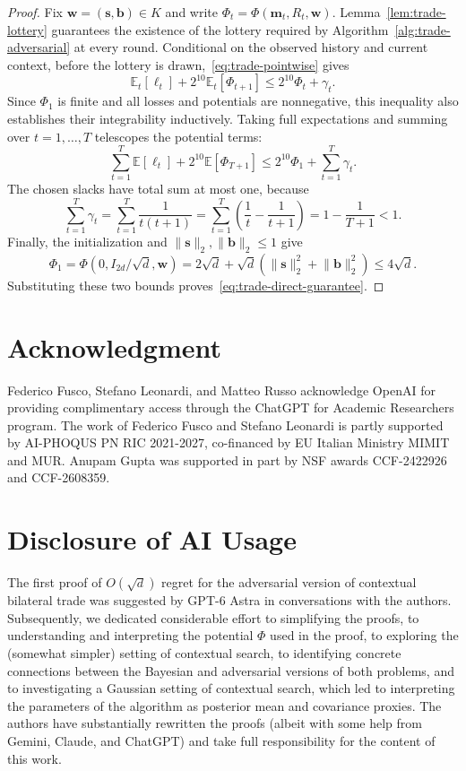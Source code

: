 \documentclass[11pt]{article}
\newcommand{\E}[1]{\mathbb E\left[#1\right]}
\newcommand{\Esub}[2]{\mathbb E_{#1}\left[#2\right]}
\newcommand{\norm}[1]{\lVert #1\rVert_2}
\newcommand{\bm}{\boldsymbol m}
\begin{document}
\begin{proof}

Fix $\boldsymbol w=(\boldsymbol s,\boldsymbol b)\in K$ and write
$\Phi_t=\Phi(\bm_t,R_t,\boldsymbol w)$. Lemma~\ref{lem:trade-lottery}
guarantees the existence of the lottery required by Algorithm~\ref{alg:trade-adversarial}
at every round. Conditional on the observed history and current context, before
the lottery is drawn,~\eqref{eq:trade-pointwise} gives
\[
 \Esub{t}{\ell_t}+2^{10}\Esub{t}{\Phi_{t+1}}
 \le2^{10}\Phi_t+\gamma_t.
\]
Since $\Phi_1$ is finite and all losses and potentials are nonnegative,
this inequality also establishes their integrability inductively. Taking full
expectations and summing over $t=1,\ldots,T$ telescopes the potential terms:
\[
 \sum_{t=1}^T\E{\ell_t}+2^{10}\E{\Phi_{T+1}}
 \le2^{10}\Phi_1+\sum_{t=1}^T\gamma_t.
\]
The chosen slacks have total sum at most one, because
\[
 \sum_{t=1}^T\gamma_t
 =\sum_{t=1}^T\frac1{t(t+1)}
 =\sum_{t=1}^T\left(\frac1t-\frac1{t+1}\right)
 =1-\frac1{T+1}<1.
\]
Finally, the initialization and $\norm{\boldsymbol s},\norm{\boldsymbol b}\le1$ give
\[
 \Phi_1=\Phi(0,I_{2d}/\sqrt d,\boldsymbol w)
 =2\sqrt d+\sqrt d(\norm{\boldsymbol s}^2+\norm{\boldsymbol b}^2)\le4\sqrt d.
\]
Substituting these two bounds proves~\eqref{eq:trade-direct-guarantee}.
\end{proof}

\section*{Acknowledgment}

    Federico Fusco, Stefano Leonardi, and Matteo Russo acknowledge OpenAI for providing complimentary access through the ChatGPT for Academic Researchers program. The work of Federico Fusco and Stefano Leonardi is partly supported by AI-PHOQUS PN RIC 2021-2027, co-financed by EU Italian Ministry MIMIT and MUR. Anupam Gupta was supported in part by NSF awards CCF-2422926 and CCF-2608359.

\section*{Disclosure of AI Usage}

The first proof of $O(\sqrt{d})$ regret for the adversarial version of contextual bilateral trade was suggested by {GPT-6 Astra in} conversations with the authors. Subsequently, we dedicated considerable effort to simplifying the proofs, to {understanding and interpreting} the potential $\Phi$ used in the proof, to exploring the (somewhat simpler) setting of contextual search, to {identifying concrete connections} between the Bayesian and adversarial versions of both problems, and to investigating a Gaussian setting of contextual search, which led to interpreting the parameters of the algorithm as posterior mean and covariance proxies. 
The authors have {substantially rewritten the proofs} (albeit with some help from Gemini, {Claude, and ChatGPT) and take} full responsibility for the content of this work.
\end{document}
